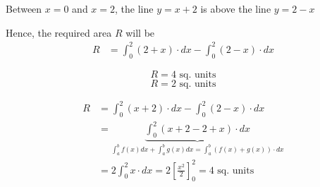 \documentclass[14pt,fleqn]{extarticle}
\begin{document}
\begin{problem}
\begin{step}
\begin{options}
    \end{options} 
     \reason 
     
     Between $x=0$ and $x=2$, the line $y = x+2$ is above the line $y = 2-x$\newline 
     
     Hence, the required area $R$ will be
     \begin{align}
	R &= \int_0^2 \left(2+x \right)\cdot dx - \int_0^2 \left(2-x \right)\cdot dx 
\end{align}
       
\end{step}

\begin{step}
  \begin{options} 
     \correct 
       \[ R = 4\text{ sq. units} \]
     \incorrect
        \[ R = 2\text{ sq. units} \]
    \end{options} 
     \reason 
     
     \begin{align}
	R &= \int_0^2 \left(x+2 \right)\cdot dx - \int_0^2 \left(2-x \right)\cdot dx\\
	&= \underbrace{\int_0^2 \left(x+2 - 2 + x \right)\cdot dx }_{\int_a^b f(x) dx + \int_a^b g(x)dx = \int_a^b \left(f(x) + g(x) \right)\cdot dx} \\
	&= 2 \int_0^2 x\cdot dx = 2 \left[\frac{x^2}{2} \right]_0^2 = 4\text{ sq. units}
\end{align}
       
\end{step}
\end{problem} 
\end{document}
